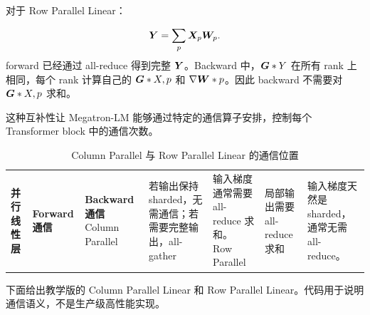 对于 Row Parallel Linear：

\[
\bm{Y}=\sum_p \bm{X}_p\bm{W}_p.
\]
forward 已经通过 all-reduce 得到完整 $\bm{Y}$。Backward 中，$\bm{G}*Y$ 在所有 rank 上相同，每个 rank 计算自己的 $\bm{G}*{X,p}$ 和 $\nabla \bm{W}*p$。因此 backward 不需要对 $\bm{G}*{X,p}$ 求和。

这种互补性让 Megatron-LM 能够通过特定的通信算子安排，控制每个 Transformer block 中的通信次数。

\begin{table}[H]
\centering
\small
\caption{Column Parallel 与 Row Parallel Linear 的通信位置}
\label{tab:column-row-parallel-communication}
\begin{tabular}{p{}p{}p{}}
\toprule
\textbf{并行线性层} & \textbf{Forward 通信} & \textbf{Backward 通信} \
\midrule
Column Parallel
& 若输出保持 sharded，无需通信；若需要完整输出，all-gather
& 输入梯度通常需要 all-reduce 求和。 \
\midrule
Row Parallel
& 局部输出需要 all-reduce 求和
& 输入梯度天然是 sharded，通常无需 all-reduce。 \
\bottomrule
\end{tabular}
\end{table}

下面给出教学版的 Column Parallel Linear 和 Row Parallel Linear。代码用于说明通信语义，不是生产级高性能实现。

